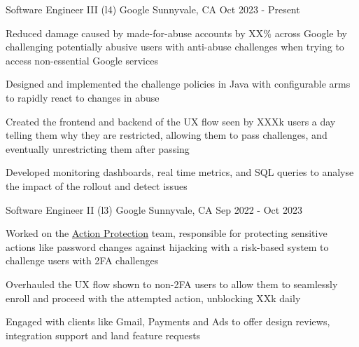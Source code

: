
\hypersetup{
    colorlinks=true,
    linkcolor=blue,
    filecolor=magenta,
    urlcolor=awesome,
}



\begin{cventries}

  \cventry
	{Software Engineer III (l4)}
    {Google}
    {Sunnyvale, CA}
    {Oct 2023 - Present}
    {
      \begin{cvitems}
        \item Reduced damage caused by made-for-abuse accounts by XX\% across Google by challenging potentially abusive users with anti-abuse challenges when trying to access non-essential Google services
		\item Designed and implemented the challenge policies in Java with configurable arms to rapidly react to changes in abuse
		\item Created the frontend and backend of the UX flow seen by XXXk users a day telling them why they are restricted, allowing them to pass challenges, and eventually unrestricting them after passing
		\item Developed monitoring dashboards, real time metrics, and SQL queries to analyse the impact of the rollout and detect issues
      \end{cvitems}
    }

  \cventry
	{Software Engineer II (l3)}
    {Google}
    {Sunnyvale, CA}
    {Sep 2022 - Oct 2023}
    {
      \begin{cvitems}
	  \item Worked on the \href{https://support.google.com/accounts/answer/7162782}{Action Protection} team, responsible for protecting sensitive actions like password changes against hijacking with a risk-based system to challenge users with 2FA challenges
	  \item Overhauled the UX flow shown to non-2FA users to allow them to seamlessly enroll and proceed with the attempted action, unblocking XXk daily
	  \item Engaged with clients like Gmail, Payments and Ads to offer design reviews, integration support and land feature requests
      \end{cvitems}
    }


\end{cventries}
